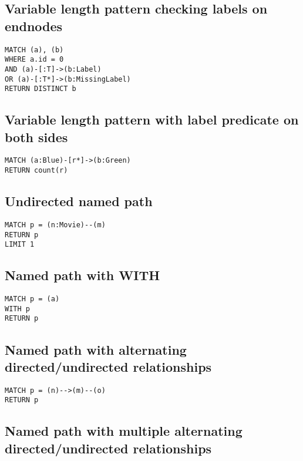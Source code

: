\subsection{Variable length pattern checking labels on endnodes}

\begin{lstlisting}
MATCH (a), (b)
WHERE a.id = 0
AND (a)-[:T]->(b:Label)
OR (a)-[:T*]->(b:MissingLabel)
RETURN DISTINCT b
\end{lstlisting}

\subsection{Variable length pattern with label predicate on both sides}

\begin{lstlisting}
MATCH (a:Blue)-[r*]->(b:Green)
RETURN count(r)
\end{lstlisting}

\subsection{Undirected named path}

\begin{lstlisting}
MATCH p = (n:Movie)--(m)
RETURN p
LIMIT 1
\end{lstlisting}

\subsection{Named path with WITH}

\begin{lstlisting}
MATCH p = (a)
WITH p
RETURN p
\end{lstlisting}

\subsection{Named path with alternating directed/undirected relationships}

\begin{lstlisting}
MATCH p = (n)-->(m)--(o)
RETURN p
\end{lstlisting}

\subsection{Named path with multiple alternating directed/undirected relationships}

